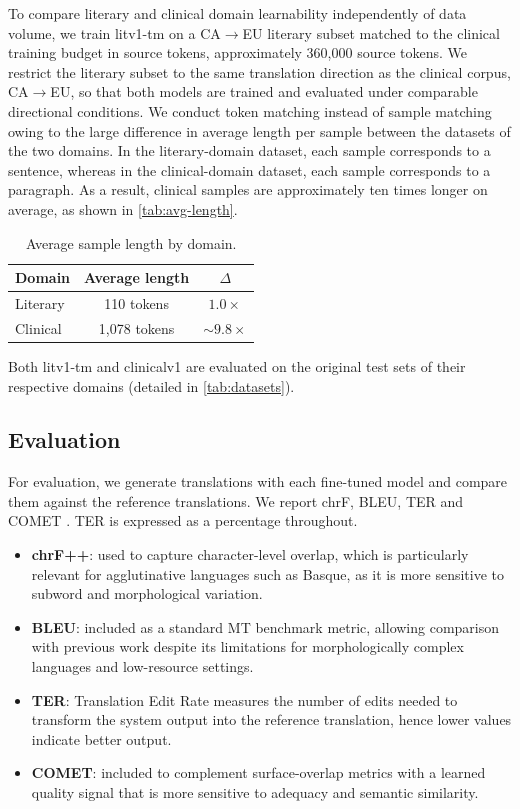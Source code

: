 \documentclass[11pt,a4paper]{article}
\begin{document}
To compare literary and clinical domain learnability independently of
data volume, we train litv1-tm on a CA$\to$EU literary subset matched
to the clinical training budget in source tokens, approximately 360,000
source tokens. We restrict the literary subset to the same translation
direction as the clinical corpus, CA$\to$EU, so that both models are
trained and evaluated under comparable directional conditions. We conduct token matching instead of sample matching owing to the large difference in average length per sample between the datasets of the two domains. In the
literary-domain dataset, each sample corresponds to a sentence, whereas in the
clinical-domain dataset, each sample corresponds to a paragraph. As a result,
clinical samples are approximately ten times longer on average, as shown in \autoref{tab:avg-length}.

\begin{table}[H]
\small
\centering
\begin{tabular}{lcc}
\toprule
\textbf{Domain} & \textbf{Average length} & \textbf{$\Delta$} \\
\midrule
Literary & 110 tokens & $1.0\times$ \\
Clinical & 1,078 tokens & $\sim 9.8\times$ \\
\bottomrule
\end{tabular}
\caption{Average sample length by domain.}
\label{tab:avg-length}
\end{table}

 Both litv1-tm and clinicalv1
are evaluated on the original test sets of their respective domains (detailed in \autoref{tab:datasets}).

\subsection{Evaluation}

For evaluation, we generate translations with each fine-tuned model and
compare them against the reference translations. We report chrF, BLEU, TER and COMET
\cite{popovic-2015-chrf,papineni-etal-2002-bleu,snover-etal-2006-study,Rei2022}.
TER is expressed as a percentage throughout.



\begin{itemize}
  \item \textbf{chrF++}: used to capture character-level overlap, which is
particularly relevant for agglutinative languages such as Basque, as it
is more sensitive to subword and morphological variation.
\item \textbf{BLEU}: included as a standard MT benchmark metric, allowing
  comparison with previous work despite its limitations for morphologically
  complex languages and low-resource settings.
 \item \textbf{TER}: Translation Edit Rate measures the number of edits
needed to transform the system output into the reference translation, hence lower values indicate better
  output.
  \item \textbf{COMET}: included to complement surface-overlap metrics with
  a learned quality signal that is more sensitive to adequacy and semantic
  similarity.
\end{itemize}
\end{document}
